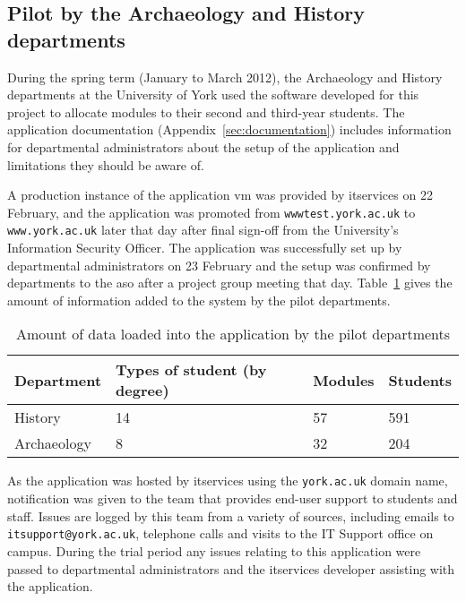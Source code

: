 
\subsection{Pilot by the Archaeology and History departments}
\label{sec:developmentpilot}

During the spring term (January to March 2012), the Archaeology and History
departments at the University of York used the software developed for this
project to allocate modules to their second and third-year students. The
application documentation (Appendix~\ref{sec:documentation}) includes
information for departmental administrators about the setup of the application
and limitations they should be aware of.

A production instance of the application \gls{vm} was provided by
\gls{itservices} on 22 February, and the application was promoted from
\texttt{wwwtest.york.ac.uk} to \texttt{www.york.ac.uk} later that day after
final sign-off from the University's Information Security Officer. The
application was successfully set up by departmental administrators on 23
February and the setup was confirmed by departments to the \gls{aso} after a
project group meeting that day.
Table~\ref{development_pilot_department_numbers} gives the amount of
information added to the system by the pilot departments.

\begin{table}
  \begin{center}
    \begin{tabular}{ | l | l | l | l | }
      \hline
      \textbf{Department}  & \textbf{Types of student (by degree)} & \textbf{Modules} & \textbf{Students} \\
      \hline
      History     & 14                           & 57      & 591      \\
      Archaeology & 8                            & 32      & 204      \\
      \hline
    \end{tabular}
  \end{center}
  \caption{Amount of data loaded into the application by the pilot departments}
  \label{development_pilot_department_numbers}
\end{table}

As the application was hosted by \gls{itservices} using the
\texttt{york.ac.uk} domain name, notification was given to the team that
provides end-user support to students and staff. Issues are logged by this
team from a variety of sources, including emails to
\texttt{itsupport@york.ac.uk}, telephone calls and visits to the IT Support
office on campus. During the trial period any issues relating to this
application were passed to departmental administrators and the
\gls{itservices} developer assisting with the application.

